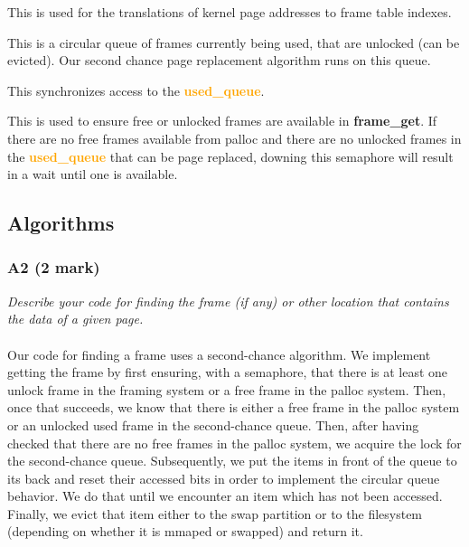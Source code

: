 \documentclass{report}
\newcommand{\question}[1]{\textit{#1} \ }
\newcommand{\fun}[1]{\textcolor{Emerald}{\textbf{#1}}}
\newcommand{\file}[1]{\textcolor{YellowGreen}{\textbf{#1}}}
\newcommand{\struct}[1]{\textcolor{orange}{\textbf{#1}}}
\newcommand{\pintoscode}[4]{}
\newcommand{\pintosfile}[3]{\pintoscode{#1}{#2}{\file{#3}}{#3}}
\begin{document}
				\pintosfile{41}{41}{frame.c}
				This is used for the translations of kernel page addresses to frame 
				table indexes.
				
				\pintosfile{53}{53}{frame.c}
				This is a circular queue of frames currently being used, that are 
				unlocked (can	be evicted). Our second chance page replacement algorithm 
				runs on this queue.

				\pintosfile{44}{44}{frame.c}
				This synchronizes access to the \struct{used\_queue}.

				\pintosfile{50}{50}{frame.c}
				This is used to ensure free or unlocked frames are available in \fun{frame\_get}.
				If there are no free frames available from palloc and there
				are no unlocked frames in the \struct{used\_queue} that can be page replaced,
				downing this semaphore will result in a wait until one is available.
				
				

		\subsection*{Algorithms}
			\subsubsection*{A2 (2 mark)}
				\question{Describe your code for finding the frame (if any) or 
				other location that contains the data of a given page.}
				\\
				\\ Our code for finding a frame uses a second-chance algorithm.
				We implement getting the frame by first ensuring, with a
				semaphore, that there is at least one unlock frame in the framing
				system or a free frame in the palloc system. 
				Then, once that succeeds, we know that there is either
				a free frame in the palloc system or an unlocked used frame in
				the second-chance queue. Then, after having checked that there
				are no free frames in the palloc system, we acquire the lock
				for the second-chance queue. Subsequently, we put the items in
				front of the queue to its back and reset their accessed bits
				in order to implement the circular queue behavior. We do that
				until we encounter an item which has not been accessed.
				Finally, we evict that item either to the swap partition or to
				the filesystem (depending on whether it is mmaped or swapped)
				and return it.
	
\end{document}
